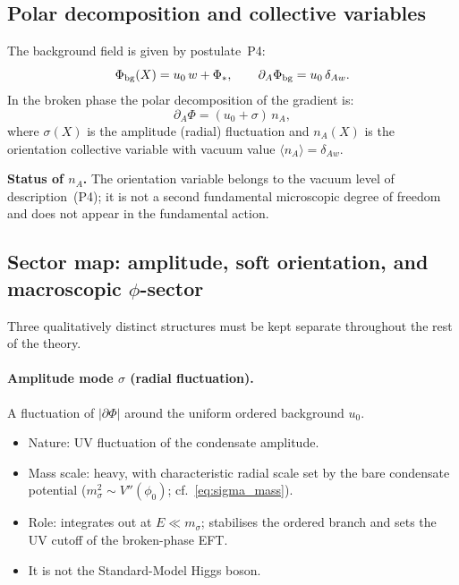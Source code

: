 \documentclass[11pt,a4paper]{article}
\numberwithin{equation}{section}
\begin{document}
\subsection{Polar decomposition and collective variables}
\label{sec:polar_decomp}

The background field is given by postulate~P4:
\begin{equation}
  \Phi_{\rm bg}(X) = u_0\,w + \Phi_*,\qquad \partial_A\Phi_{\rm bg} = u_0\,\delta_{Aw}.
\end{equation}
In the broken phase the polar decomposition of the gradient is:
\begin{equation}
  \label{eq:polar}
  \partial_A\Phi = (u_0 + \sigma)\,n_A,
\end{equation}
where $\sigma(X)$ is the amplitude (radial) fluctuation and
$n_A(X)$ is the orientation collective variable with vacuum value
$\langle n_A\rangle = \delta_{Aw}$.

\noindent\textbf{Status of $n_A$.}
The orientation variable belongs to the vacuum level of description~(P4);
it is not a second fundamental microscopic degree of freedom
and does not appear in the fundamental action.


\subsection{Sector map: amplitude, soft orientation, and macroscopic
\texorpdfstring{$\phi$}{phi}-sector}
\label{sec:sector_map}

Three qualitatively distinct structures must be kept separate throughout
the rest of the theory.

\paragraph{Amplitude mode $\sigma$ (radial fluctuation).}
A fluctuation of $|\partial\Phi|$ around the uniform ordered background $u_0$.
\begin{itemize}
  \item Nature: UV fluctuation of the condensate amplitude.
  \item Mass scale: heavy, with characteristic radial scale set by the
    bare condensate potential ($m_\sigma^2\sim V''(\phi_0)$;
    cf.~\eqref{eq:sigma_mass}).
  \item Role: integrates out at $E\ll m_\sigma$; stabilises the ordered
    branch and sets the UV cutoff of the broken-phase EFT.
  \item It is not the Standard-Model Higgs boson.
\end{itemize}
\end{document}
